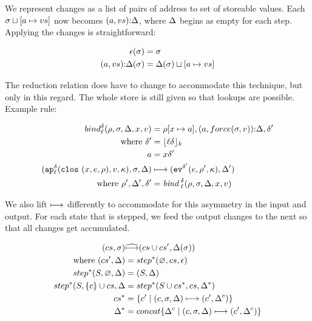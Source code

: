 \documentclass[preprint,onecolumn,9pt]{sigplanconf} %
\begin{document}
We represent changes as a list of pairs of address to set of storeable
values. Each $\msto\sqcup[\maddr \mapsto \mval{s}]$ now becomes
$\cons{\ttuple{\maddr}{\mval{s}}}{\msdiff}$, where $\msdiff$ begins as empty for
each step. Applying the changes is straightforward:

\begin{align*}
\mtlst(\msto) &= \msto \\
\cons{\ttuple{\maddr}{\mval{s}}}{\msdiff}(\msto) &= \msdiff(\msto)\sqcup[\maddr \mapsto \mval{s}]
\end{align*}

The reduction relation does have to change to accommodate this
technique, but only in this regard. The whole store is still given so
that lookups are possible. Example rule:

\begin{align*}
bind^{\mcntr}_\mlab(\menv, \msto, \msdiff, \mvar, \mval) &= \menv[\mvar \mapsto \maddr], \cons{\ttuple{\maddr}{force(\msto,\mval)}}{\msdiff}, \mcntr' \\
\text{ where } \mcntr' &= \lfloor \mlab \mcntr\rfloor_k \\
               \maddr &= \mvar\mcntr' \\
(\ap[^\mcntr_\mlab]{\clos{\mvar,\mexp,\menv},\mval,\mkont},\msto,\msdiff) & \machstep
(\ev[^{\mcntr'}]{\mexp,\menv',\mkont},\msdiff') \\
\text{ where }\menv',\msdiff',\mcntr' &= \mathit{bind\,}^{ \mcntr}_\mlab(\menv,\msto,\msdiff,\mvar,\mval)
\end{align*}

We also lift $\machstep$ differently to accommodate for this asymmetry
in the input and output. For each state that is stepped, we feed the
output changes to the next so that all changes get accumulated.

\begin{align*}
(cs, \msto) &\widehat{\machstep} (cs\cup cs', \msdiff(\msto)) \\
\mbox{ where } (cs', \msdiff) &= step^*(\varnothing, cs, \mtlst) \\
step^*(S, \varnothing, \msdiff) &= (S, \msdiff) \\
step^*(S, \{c\}\cup cs, \msdiff &= step^*(S\cup cs^*, cs, \msdiff^*) \\
cs^* &= \{c' \mid (c,\msto,\msdiff) \machstep (c',\msdiff^c) \} \\
\msdiff^* &= concat\{\msdiff^c \mid (c, \msto,\msdiff) \machstep (c', \msdiff^c)\}
\end{align*}
\end{document}
